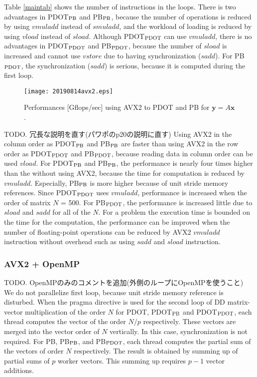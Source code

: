 \documentclass{IOS-Book-Article}
\begin{document}
Table \ref{maintab} shows the number of instructions in the loops.
There is two advantages in PDOT$_{\rm{PB}}$ and PB$_{\rm{PB}}$, because the number of operations is reduced by using $vmuladd$ instead of $smuladd$, and the workload of loading is reduced by using $vload$ instead of $sload$. Although PDOT$_{\rm{PDOT}}$ can use $vmuladd$, there is no advantages in PDOT$_{\rm{PDOT}}$ and PB$_{\rm{PDOT}}$, because the number of $sload$ is increased and cannot use $vstore$ due to having synchronization ($sadd$). For PB$_{\rm{PDOT}}$, the synchronization ($sadd$) is serious, because it is computed during the first loop.

\begin{figure}[htbp]
  \begin{center}
    \texttt{[image: 20190814avx2.eps]}
    \caption{Performances [Gflops/sec] using AVX2 to PDOT and PB for $\bm{y} = A\bm{x}$.}
    \label{figMV}
  \end{center}
\end{figure}

TODO. 冗長な説明を直す(パワポのp20の説明に直す)
Using AVX2 in the column order as PDOT$_{\rm{PB}}$ and PB$_{\rm{PB}}$ are faster than using AVX2 in the row order as PDOT$_{\rm{PDOT}}$ and PB$_{\rm{PDOT}}$, because reading data in column order can be used $vload$.
For PDOT$_{\rm{PB}}$ and PB$_{\rm{PB}}$, the performance is nearly four times higher than the without using AVX2, because the time for computation is reduced by $vmuladd$. Especially, PB$_{\rm{PB}}$ is more higher because of unit stride memory references. Since PDOT$_{\rm{PDOT}}$ uses $vmuladd$, performance is increased when the order of matrix $N$ = 500. For PB$_{\rm{PDOT}}$, the performance is increased little due to $sload$ and $sadd$ for all of the $N$.
For a problem the execution time is bounded on the time for the computation, the performance can be improved when the number of floating-point operations can be reduced by AVX2 $vmuladd$ instruction without overhead such as using $sadd$ and $sload$ instruction.



\subsubsection{AVX2 + OpenMP}
TODO. OpenMPのみのコメントを追加(外側のループにOpenMPを使うこと)
We do not parallelize first loop, because unit stride memory reference is disturbed. When the pragma directive is used for the second loop of DD matrix-vector multiplication of the order $N$ for PDOT, PDOT$_{\rm{PB}}$ and PDOT$_{\rm{PDOT}}$, each thread computes the vector of the order $N/p$ respectively. These vectors are merged into the vector order of $N$ vertically. In this case, synchronization is not required. For PB, PB$_{\rm{PB}}$, and PB$_{\rm{PDOT}}$, each thread computes the partial sum of the vectors of order $N$ respectively. The result is obtained by summing up of partial sums of $p$ worker vectors. This summing up requires $p-1$ vector additions.
\end{document}
